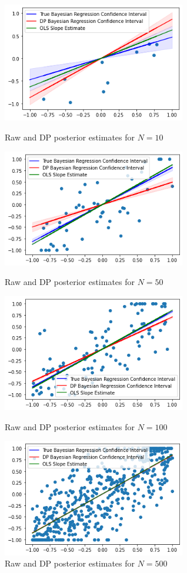 \documentclass[11pt,conference]{IEEEtran}
\begin{document}
\begin{figure}[htbp]
\centerline{\includegraphics[width=8cm]{plots/bayes_10.png}}
\caption{Raw and DP posterior estimates for $N=10$} \bigskip
\centerline{\includegraphics[width=8cm]{plots/bayes_50.png}}
\caption{Raw and DP posterior estimates for $N=50$} \bigskip
\centerline{\includegraphics[width=8cm]{plots/bayes_100.png}}
\caption{Raw and DP posterior estimates for $N=100$} \bigskip
\centerline{\includegraphics[width=8cm]{plots/bayes_500.png}}
\caption{Raw and DP posterior estimates for $N=500$} \bigskip
\label{fig}
\end{figure}
\end{document}

